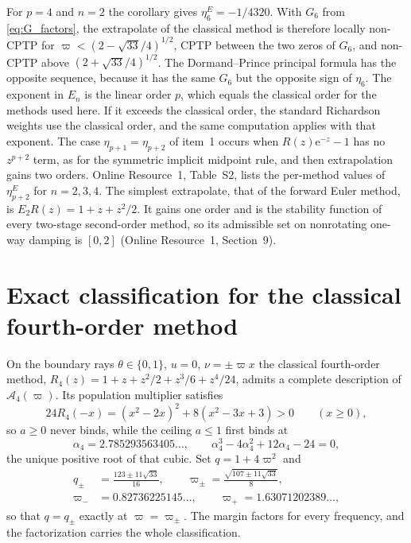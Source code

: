 \documentclass[pdflatex,sn-mathphys-num]{sn-jnl}
\newcommand{\e}{\mathrm{e}}
\newcommand{\Adm}{\mathcal A}
\theoremstyle{thmstyleone}
\theoremstyle{thmstylethree}
\theoremstyle{thmstyletwo}
\begin{document}
For $p=4$ and $n=2$ the corollary gives $\eta^E_6=-1/4320$. With $G_6$ from \eqref{eq:G_factors}, the extrapolate of the classical method is therefore locally non-CPTP for $\varpi<{(2-\sqrt{33}/4)^{1/2}}$, CPTP between the two zeros of $G_6$, and non-CPTP above ${(2+\sqrt{33}/4)^{1/2}}$. The Dormand--Prince principal formula has the opposite sequence, because it has the same $G_6$ but the opposite sign of $\eta_6$. The exponent in $E_n$ is the linear order $p$, which equals the classical order for the methods used here. If it exceeds the classical order, the standard Richardson weights use the classical order, and the same computation applies with that exponent. The case $\eta_{p+1}=\eta_{p+2}$ of item~1 occurs when $R(z)\e^{-z}-1$ has no $z^{p+2}$ term, as for the symmetric implicit midpoint rule, and then extrapolation gains two orders. Online Resource~1, Table~S2, lists the per-method values of $\eta^E_{p+2}$ for $n=2,3,4$. The simplest extrapolate, that of the forward Euler method, is $E_2R(z)=1+z+z^2/2$. It gains one order and is the stability function of every two-stage second-order method, so its admissible set on nonrotating one-way damping is $[0,2]$ (Online Resource~1, Section~9).
\section{Exact classification for the classical fourth-order method}\label{sec:rk4}

On the boundary rays $\theta\in\{0,1\}$, $u=0$, $\nu=\pm\varpi x$ the classical fourth-order method, $R_4(z)=1+z+z^2/2+z^3/6+z^4/24$, admits a complete description of $\Adm_4(\varpi)$. Its population multiplier satisfies
\begin{equation}
 24R_4(-x)=(x^2-2x)^2+8(x^2-3x+3)>0\qquad(x\ge0),
 \label{eq:rk4_population}
\end{equation}
so $a\ge0$ never binds, while the ceiling $a\le1$ first binds at
\begin{equation}
 \alpha_4=2.785293563405\ldots,\qquad \alpha_4^3-4\alpha_4^2+12\alpha_4-24=0,
 \label{eq:alpha4}
\end{equation}
the unique positive root of that cubic. Set $q=1+4\varpi^2$ and
\begin{equation}
\begin{aligned}
 q_\pm&=\frac{123\pm11\sqrt{33}}{16},\qquad
 \varpi_\pm=\frac{\sqrt{107\pm11\sqrt{33}}}{8},\\
 \varpi_-&=0.82736225145\ldots,\qquad \varpi_+=1.63071202389\ldots,
\end{aligned}
 \label{eq:qcrit}
\end{equation}
so that $q=q_\pm$ exactly at $\varpi=\varpi_\pm$. The margin factors for every frequency, and the factorization carries the whole classification.
\end{document}
